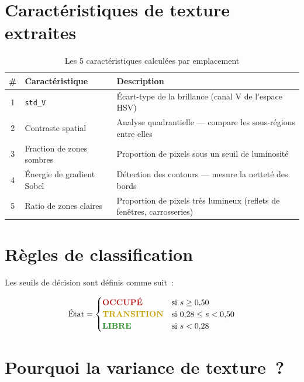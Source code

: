 \documentclass[12pt,a4paper]{report}
\begin{document}
\section{Caractéristiques de texture extraites}

\begin{table}[h!]
  \centering
  \caption{Les 5 caractéristiques calculées par emplacement}
  \begin{tabularx}{\textwidth}{clX}
    \toprule
    \textbf{\#} & \textbf{Caractéristique} & \textbf{Description} \\
    \midrule
    1 & \texttt{std\_V}             & Écart-type de la brillance (canal V de l'espace HSV) \\
    2 & Contraste spatial           & Analyse quadrantielle — compare les sous-régions entre elles \\
    3 & Fraction de zones sombres   & Proportion de pixels sous un seuil de luminosité \\
    4 & Énergie de gradient Sobel   & Détection des contours — mesure la netteté des bords \\
    5 & Ratio de zones claires      & Proportion de pixels très lumineux (reflets de fenêtres, carrosseries) \\
    \bottomrule
  \end{tabularx}
\end{table}

\section{Règles de classification}

Les seuils de décision sont définis comme suit~:

\begin{tcolorbox}[colback=gray!5, colframe=myblue, title={Seuils de classification}, fonttitle=\bfseries]
\[
  \text{État} =
  \begin{cases}
    \textcolor{myred}{\textbf{OCCUPÉ}}     & \text{si } s \geq 0{,}50 \\
    \textcolor{myyellow}{\textbf{TRANSITION}} & \text{si } 0{,}28 \leq s < 0{,}50 \\
    \textcolor{mygreen}{\textbf{LIBRE}}    & \text{si } s < 0{,}28
  \end{cases}
\]
\end{tcolorbox}

\section{Pourquoi la variance de texture~?}
\end{document}
